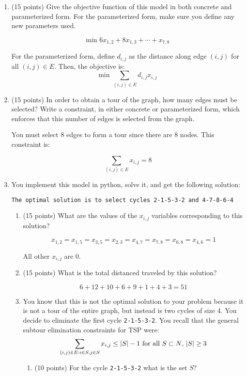 \documentclass[letterpaper,oneside,12pt]{article}%
\newcommand{\blu}{\color{blue}}
\begin{document}
\begin{enumerate}
\item (15 points) Give the objective function of this model in both concrete and parameterized form. For the parameterized form, make sure you define any new parameters used. 

{\blu
\[
\text{min } 6 x_{1,2}+8 x_{1,3} + \cdots + x_{7,8}
\]

For the parameterized form, define $d_{i,j}$ as the distance along edge $(i,j)$ for all $(i,j) \in E$. Then, the objective is:
\[
\text{min } \sum_{(i,j) \in E} d_{i,j} x_{i,j}
\]

}

\item (15 points) In order to obtain a tour of the graph, how many edges must be selected? Write a constraint, in either concrete or parameterized form, which enforces that this number of edges is selected from the graph. 

{\blu
You must select 8 edges to form a tour since there are 8 nodes. This constraint is:

\[
\sum_{(i,j) \in E} x_{i,j} = 8
\]
}


\newpage

\item You implement this model in python, solve it, and get the following solution:

	\verb|The optimal solution is to select cycles 2-1-5-3-2 and 4-7-8-6-4|
		\begin{enumerate}
		\item (15 points) What are the values of the $x_{i,j}$ variables corresponding to this solution? 

{\blu
\[
x_{1,2}=x_{1,5}=x_{3,5}=x_{2,3}=x_{4,7}=x_{7,8} = x_{6,8} = x_{4,6} = 1
\]

All other $x_{i,j}$ are 0.

}

		\vfill
		\item (15 points) What is the total distanced traveled by this solution?  

{\blu

\[
6+12+10+6+9+1+4+3=51
\]
}		\vfill
		
		
		\item You know that this is not the optimal solution to your problem because it is not a tour of the entire graph, but instead is two cycles of size 4. You decide to eliminate the first cycle \verb|2-1-5-3-2|. You recall that the general subtour elimination constraints for TSP were:
		\[
		\sum_{(i,j) \in E: \\ i \in S, j \in S} x_{i,j} \leq |S| - 1 \text{ for all $S \subset N$, $|S| \geq 3$}
		\]
			\begin{enumerate}
			\item (10 points) For the cycle \verb|2-1-5-3-2| what is the set $S$? 


\end{enumerate}
\end{enumerate}
\end{enumerate}
\end{document}
